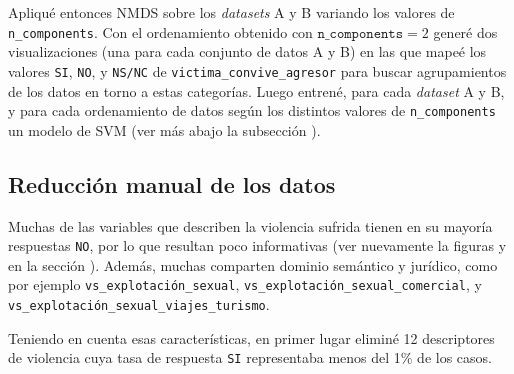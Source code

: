 \documentclass[10 pt]{article}
\begin{document}
Apliqué entonces NMDS sobre los \textit{datasets} A y B variando los valores de \texttt{n\_components}. Con el ordenamiento obtenido con \(\texttt{n\_components} = 2\) generé dos visualizaciones (una para cada conjunto de datos A y B) en las que mapeé los valores \texttt{SI}, \texttt{NO}, y \texttt{NS/NC} de \texttt{victima\_convive\_agresor} para buscar agrupamientos de los datos en torno a estas categorías. Luego entrené, para cada \textit{dataset} A y B, y para cada ordenamiento de datos según los distintos valores de \texttt{n\_components} un modelo de SVM (ver más abajo la subsección ).


\subsection{Reducción manual de los datos}\label{reduccionmanual}

Muchas de las variables que describen la violencia sufrida tienen en su mayoría respuestas \texttt{NO}, por lo que resultan poco informativas (ver nuevamente la figuras  y  en la sección ). Además, muchas comparten dominio semántico y jurídico, como por ejemplo \texttt{vs\_explotación\_sexual}, \texttt{vs\_explotación\_sexual\_comercial}, y \texttt{vs\_explotación\_sexual\_viajes\_turismo}. 

Teniendo en cuenta esas características, en primer lugar eliminé 12 descriptores de violencia cuya tasa de respuesta \texttt{SI} representaba menos del 1\% de los casos.
\end{document}
